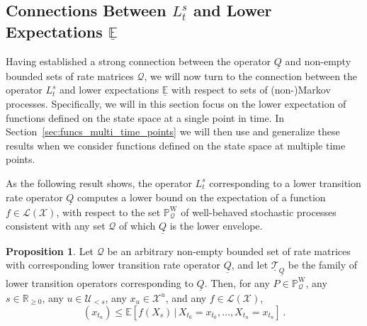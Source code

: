 \documentclass[10pt]{paper}
\theoremstyle{definition}
\newtheorem{proposition}[theorem]{Proposition}
\newcommand{\reals}{\mathbb{R}}
\newcommand{\realsnonneg}{\reals_{\geq 0}}
\newcommand{\states}{\mathcal{X}}
\newcommand{\processes}{\mathbb{P}}
\newcommand{\wprocesses}{\processes^{\mathrm{W}}}
\newcommand{\gambles}{\mathcal{L}}
\newcommand{\gamblesX}{\gambles(\states)}
\newcommand{\rateset}{\mathcal{Q}}
\newcommand{\lrate}{\underline{Q}}
\begin{document}



\subsection{Connections Between $L_t^s$ and Lower Expectations $\underline{\mathbb{E}}$}\label{sec:single_var_lower_exp}

Having established a strong connection between the operator $\lrate$ and non-empty bounded sets of rate matrices $\rateset$, we will now turn to the connection between the operator $L_t^s$ and lower expectations $\underline{\mathbb{E}}$ with respect to sets of (non-)Markov processes. Specifically, we will in this section focus on the lower expectation of functions defined on the state space at a single point in time. In Section~\ref{sec:funcs_multi_time_points} we will then use and generalize these results when we consider functions defined on the state space at multiple time points.

As the following result shows, the operator $L_t^s$ corresponding to a lower transition rate operator $\lrate$ computes a lower bound on the expectation of a function $f\in\gamblesX$, with respect to the set $\wprocesses_\rateset$ of well-behaved stochastic processes consistent with any set $\rateset$ of which $\lrate$ is the lower envelope.

\begin{proposition}\label{theorem:nonmarkov_single_var_lower_bounded}
Let $\rateset$ be an arbitrary non-empty bounded set of rate matrices with corresponding lower transition rate operator $\lrate$, and let $\underline{\mathcal{T}}_{\lrate}$ be the family of lower transition operators corresponding to $\lrate$. Then, for any $P\in\wprocesses_\rateset$, any $s\in\realsnonneg$, any $u\in\mathcal{U}_{<s}$, any $x_u\in\states^u$, and any $f\in\gamblesX$,
\begin{equation*}
[L_{t_n}^s f](x_{t_n}) \leq \mathbb{E}[f(X_s)\,\vert\,X_{t_0}=x_{t_0},\ldots,X_{t_n}=x_{t_n}]\,.
\end{equation*}
\end{proposition}
\end{document}
